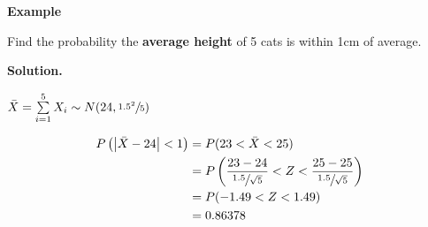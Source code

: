 \textbf{Example}

Find the probability the \textbf{average height} of 5 cats is within 1cm of average.

\textbf{Solution.}

$ \bar{X}=\sum\limits_{i=1}^{5} X_i \sim N(24,\sfrac{1.5^2}{5}) $

\begin{align*}
    P\left(\left|\bar{X}-24\right|<1\right) & =
    P(23<\bar{X}<25)                                                                          \\
                                            & =P\left( \frac{23-24}{\sfrac{1.5}{\sqrt{5}}}<Z<
    \frac{25-25}{\sfrac{1.5}{\sqrt{5}}} \right)                                               \\
                                            & =P(-1.49<Z<1.49)                                \\
                                            & =0.86378
\end{align*}
